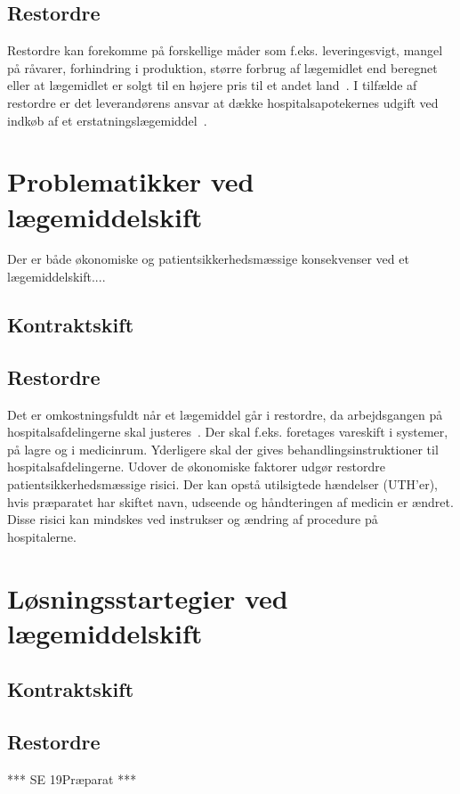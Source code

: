 \subsection{Restordre}
Restordre kan forekomme på forskellige måder som f.eks. leveringesvigt, mangel på råvarer, forhindring i produktion, større forbrug af lægemidlet end beregnet eller at lægemidlet er solgt til en højere pris til et andet land~\citep{Amgros2017}. I tilfælde af restordre er det leverandørens ansvar at dække hospitalsapotekernes udgift ved indkøb af et erstatningslægemiddel~.


\section{Problematikker ved lægemiddelskift}
Der er både økonomiske og patientsikkerhedsmæssige konsekvenser ved et lægemiddelskift....

\subsection{Kontraktskift}

\subsection{Restordre}
Det er omkostningsfuldt når et lægemiddel går i restordre, da arbejdsgangen på hospitalsafdelingerne skal justeres~\citep{Amgros2015}. Der skal f.eks. foretages vareskift i systemer, på lagre og i medicinrum. Yderligere skal der gives behandlingsinstruktioner til hospitalsafdelingerne. Udover de økonomiske faktorer udgør restordre patientsikkerhedsmæssige risici. Der kan opstå utilsigtede hændelser (UTH'er), hvis præparatet har skiftet navn, udseende og håndteringen af medicin er ændret. Disse risici kan mindskes ved instrukser og ændring af procedure på hospitalerne.~\citep{Amgros2015}


\section{Løsningsstartegier ved lægemiddelskift}

\subsection{Kontraktskift}

\subsection{Restordre}

*** SE 19Præparat ***